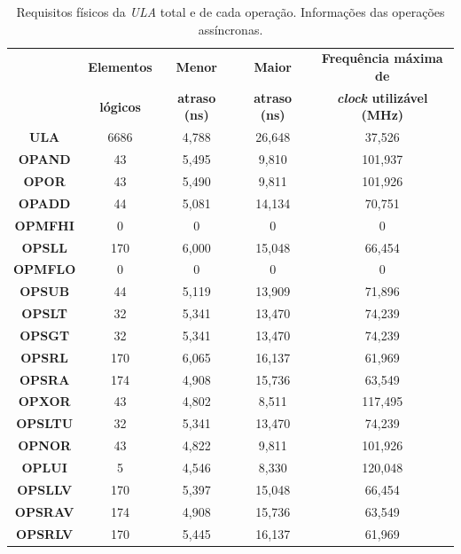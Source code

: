 \documentclass[12pt]{article}
\begin{document}
\begin{table}[H]
	\centering
	\begin{tabular}{|c|c|c|c|c|}
		\hline
		& \textbf{Elementos} & \textbf{Menor} & \textbf{Maior} & \textbf{Frequência máxima de} \\
		& \textbf{lógicos} & \textbf{atraso (ns)} &  \textbf{atraso (ns)} & \textbf{\textit{clock} utilizável (MHz)} \\
		\hline
		\textbf{ULA} & 6686 & 4,788 & 26,648 & 37,526 \\\hline
		\textbf{OPAND} & 43 & 5,495 & 9,810 & 101,937 \\\hline
		\textbf{OPOR} & 43 & 5,490 & 9,811 & 101,926 \\\hline
		\textbf{OPADD} & 44 & 5,081 & 14,134 & 70,751 \\\hline
		\textbf{OPMFHI} & 0 & 0 & 0 & 0 \\\hline
		\textbf{OPSLL} & 170 & 6,000 & 15,048 & 66,454 \\\hline
		\textbf{OPMFLO} & 0 & 0 & 0 & 0 \\\hline
		\textbf{OPSUB} & 44 & 5,119 & 13,909 & 71,896 \\\hline
		\textbf{OPSLT} & 32 & 5,341 & 13,470 & 74,239 \\\hline
		\textbf{OPSGT} & 32 & 5,341 & 13,470 & 74,239 \\\hline
		\textbf{OPSRL} & 170 & 6,065 & 16,137 & 61,969 \\\hline
		\textbf{OPSRA} & 174 & 4,908 & 15,736 & 63,549 \\\hline
		\textbf{OPXOR} & 43 & 4,802 & 8,511 & 117,495 \\\hline
		\textbf{OPSLTU} & 32 & 5,341 & 13,470 & 74,239 \\\hline
		\textbf{OPNOR} & 43 & 4,822 & 9,811 & 101,926 \\\hline
		\textbf{OPLUI} & 5 & 4,546 & 8,330 & 120,048 \\\hline
		\textbf{OPSLLV} & 170 & 5,397 & 15,048 & 66,454 \\\hline
		\textbf{OPSRAV} & 174 & 4,908 & 15,736 & 63,549 \\\hline
		\textbf{OPSRLV} & 170 & 5,445 & 16,137 & 61,969 \\\hline
	\end{tabular}
	\caption{Requisitos físicos da \textit{ULA} total e de cada operação. Informações das operações assíncronas.}
	\label{tab:req21}
\end{table}
\end{document}
